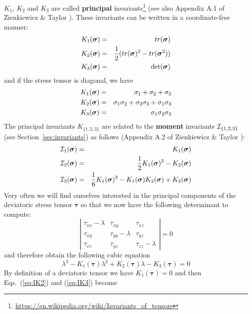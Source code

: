 $K_1$, $K_2$ and $K_3$ are called {\bf principal}
invariants\footnote{\url{https://en.wikipedia.org/wiki/Invariants_of_tensors}} 
(see also Appendix A.1 of Zienkiewicz \& Taylor \cite{zita2}). 
These invariants can be written in a coordinate-free manner:
\begin{eqnarray}
K_1({\bm \sigma}) &=& tr({\bm \sigma})  \nonumber\\
K_2({\bm \sigma}) &=& \frac{1}{2}(  tr({\bm \sigma}) ^2 - tr({\bm \sigma}^2)  ) \nonumber\\
K_3({\bm \sigma}) &=& \det ({\bm \sigma}) \nonumber
\end{eqnarray}
and if the stress tensor is diagonal, we have
\begin{eqnarray}
K_1({\bm \sigma}) &=& \sigma_{1}+\sigma_{2}+\sigma_{3}\nonumber\\
K_2({\bm \sigma}) &=& \sigma_{1}\sigma_{2}+\sigma_{2}\sigma_{3}+\sigma_{1}\sigma_{3} \nonumber\\
K_3({\bm \sigma}) &=& \sigma_1\sigma_2\sigma_3 \nonumber
\end{eqnarray}
The principal invariants $K_{\{1,2,3\}}$ are related to the {\bf moment} invariants ${\cal I}_{\{1,2,3\}}$ 
(see Section~\ref{sec:invariants}) as follows (Appendix A.2 of Zienkiewicz \& Taylor \cite{zita2}):
\begin{eqnarray}
{\cal I}_1({\bm \sigma})&=& K_1({\bm \sigma}) \\ 
{\cal I}_2({\bm \sigma})&=& \frac{1}{2}K_1({\bm \sigma})^2 -K_2({\bm \sigma}) \label{eq:IK2}\\
{\cal I}_3({\bm \sigma})&=& \frac{1}{6}K_1({\bm \sigma})^3 -K_1({\bm \sigma}) K_2({\bm \sigma}) +K_3({\bm \sigma}) \label{eq:IK3}
\end{eqnarray}
Very often we will find ourselves interested in the principal components 
of the deviatoric stress tensor $\bm \tau$ so that we now have the following determinant to compute:
\[
\left|  
\begin{array}{ccc}
\tau_{xx}-\lambda & \tau_{xy} & \tau_{xz} \\
\tau_{xy} & \tau_{yy}-\lambda & \tau_{yz} \\
\tau_{xz} & \tau_{yz} & \tau_{zz} -\lambda
\end{array}
\right|
=0
\]
and therefore obtain the following cubic equation
\begin{equation}
\lambda^3 - K_1({\bm \tau}) \lambda^2 + K_2({\bm \tau}) \lambda -K_3({\bm \tau})=0
\end{equation}
By definition of a deviatoric tensor we have $K_1({\bm \tau})=0$ and then Eqs.~(\ref{eq:IK2}) and (\ref{eq:IK3}) become
